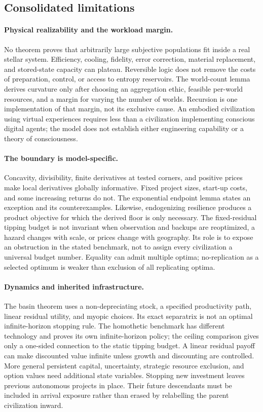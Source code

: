 \subsection{Consolidated limitations}
\label{sec:limitations}
\paragraph{Physical realizability and the workload margin.}
No theorem proves that arbitrarily large subjective populations fit inside
a real stellar system. Efficiency, cooling, fidelity, error correction,
material replacement, and stored-state capacity can plateau. Reversible
logic does not remove the costs of preparation, control, or access to
entropy reservoirs. The world-count lemma derives curvature only after
choosing an aggregation ethic, feasible per-world resources, and a margin
for varying the number of worlds. Recursion is one implementation of that
margin, not its exclusive cause. An embodied civilization using virtual
experiences requires less than a civilization implementing conscious
digital agents; the model does not establish either engineering capability
or a theory of consciousness.

\paragraph{The boundary is model-specific.}
Concavity, divisibility, finite derivatives at tested corners, and positive
prices make local derivatives globally informative. Fixed project sizes,
start-up costs, and some increasing returns do not. The exponential
endpoint lemma states an exception and its counterexamples. Likewise,
endogenizing resilience produces a product objective for which the derived
floor is only necessary. The fixed-residual tipping budget is not invariant
when observation and backups are reoptimized, a hazard changes with scale,
or prices change with geography. Its role is to expose an obstruction in
the stated benchmark, not to assign every civilization a universal budget
number. Equality can admit multiple optima; no-replication as a selected
optimum is weaker than exclusion of all replicating optima.

\paragraph{Dynamics and inherited infrastructure.}
The basin theorem uses a non-depreciating stock, a specified productivity
path, linear residual utility, and myopic choices. Its exact separatrix is
not an optimal infinite-horizon stopping rule. The homothetic benchmark
has different technology and proves its own infinite-horizon policy;
the ceiling comparison gives only a one-sided connection to the static
tipping budget. A linear residual payoff can make discounted value
infinite unless growth and discounting are controlled. More general
persistent capital, uncertainty, strategic resource exclusion, and
option values need additional state variables. Stopping new investment
leaves previous autonomous projects in place. Their future descendants
must be included in arrival exposure rather than erased by relabelling
the parent civilization inward.

